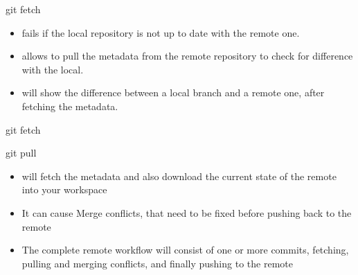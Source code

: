 \begin{frame}[fragile]{git fetch}
    \begin{itemize}
        \item {} fails if the local repository is not up to date with the remote one.
        \item {} allows to pull the metadata from the remote repository to check for difference with the local.
        \item {} will show the difference between a local branch and a remote one, after fetching the metadata.
    \end{itemize}
\end{frame}

\begin{frame}[fragile]{git fetch \insertcontinuationtext}
\end{frame}

\begin{frame}[fragile]{git pull}
    \begin{itemize}
        \item {} will fetch the metadata and also download the current state of the remote into your workspace
        \item It can cause Merge conflicts, that need to be fixed before pushing back to the remote
        \item The complete remote workflow will consist of one or more \alert{commits}, \alert{fetching}, \alert{pulling} and \alert{merging conflicts}, and finally \alert{pushing} to the remote
    \end{itemize}
\end{frame}

